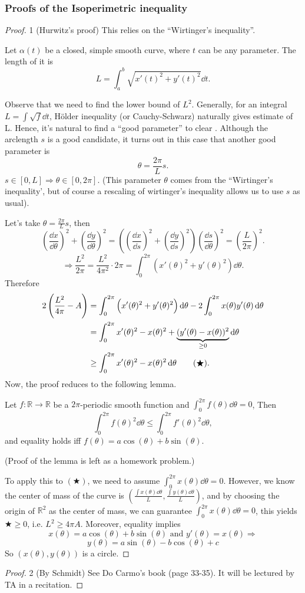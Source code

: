 \subsubsection*{Proofs of the Isoperimetric inequality}
\begin{proof}1 (Hurwitz's proof) This relies on the ``Wirtinger's inequality''.
    
Let $\alpha(t)$ be a closed, simple smooth curve, where $t$ can be any parameter. The length of it is 
\[L=\int_a^b\sqrt{x'(t)^2+y'(t)^2}\dd t.\]

Observe that we need to find the lower bound of $L^2$. 
Generally, for an integral $L=\int \sqrt{f}\dd t$, H\"older 
inequality (or Cauchy-Schwarz) naturally gives estimate of
L. Hence, it's natural to find a ``good parameter'' to 
clear . Although the arclength $s$ is a good candidate, it 
turns out in this case that another good parameter is 
\[\theta=\frac{2\pi}{L}s.\]
$s\in [0,L]\Rightarrow \theta \in [0,2\pi]$.
(This parameter $\theta$ comes from the ``Wirtinger's inequality', but of course a rescaling of wirtinger's inequality allows us to use $s$ as usual).

Let's take $\theta=\frac{2\pi}{L}s$, then
\[\left(\frac{\dd x}{\dd \theta}\right)^2+\left(\frac{\dd y}{\dd \theta}\right)^2=\left(\left(\frac{\dd x}{\dd s}\right)^2+\left(\frac{\dd y}{\dd s}\right)^2\right)\left(\frac{\dd s}{\dd \theta}\right)^2=\left(\frac{L}{2\pi}\right)^2.\]
\[\Rightarrow \frac{L^2}{2\pi}=\frac{L^2}{4\pi^2}\cdot 2\pi=\int_0^{2\pi}\left(x'(\theta)^2+y'(\theta)^2\right)\dd \theta.\]
Therefore
\begin{align}
    2\left(\frac{L^2}{4\pi}-A\right)&=\int_0^{2\pi}\left(x'(\theta)^2+y'(\theta)^2\right)\operatorname{d\!} \theta-2\int_0^{2\pi}x(\theta)y'(\theta)\operatorname{d\!} \theta \notag\\
    &=\int_0^{2\pi}x'(\theta)^2-x(\theta)^2+\underbrace{(y'(\theta)-x(\theta))^2}_{\ge 0}\operatorname{d\!} \theta \notag\\
    &\ge \int_0^{2\pi}x'(\theta)^2-x(\theta)^2 \operatorname{d\!} \theta \tag{$\bigstar$}
.\end{align}
Now, the proof reduces to the following lemma.

\begin{lemma}
    Let $f\colon\mathbb{R}\to \mathbb{R}$ be a $2\pi$-periodic smooth
     function and $\int_0^{2\pi}f(\theta)\dd \theta=0$, Then
    \[\int_0^{2\pi}f(\theta)^2\dd \theta\le \int_0^{2\pi}f'(\theta)^2\dd \theta,\]
    and equality holds iff $f(\theta)=a\cos(\theta)+b\sin(\theta)$.
\end{lemma}
(Proof of the lemma is left as a homework problem.)

To apply this to $(\bigstar)$, we need to assume $\int_0^{2\pi}x(\theta)\dd \theta=0$. However, we know the center of mass of the curve is $\left(\frac{\int x(\theta)\dd \theta}{L},\frac{\int y(\theta)\dd \theta}{L}\right)$, and by choosing the origin of $\mathbb{R}^2$ as the center of mass, we can guarantee $\int_0^{2\pi}x(\theta)\dd \theta=0$, this yields $\bigstar\ge 0$, i.e. $L^2\ge 4\pi A$. Moreover, equality implies
\[x(\theta)=a\cos(\theta)+b\sin(\theta)\text{ and }y'(\theta)=x(\theta)\Rightarrow\]
\[y(\theta)=a\sin(\theta)-b\cos(\theta)+c\]
So $(x(\theta),y(\theta))$ is a circle.
\end{proof}
\begin{proof}2 (By Schmidt)
    See Do Carmo's book (page 33-35). It will be lectured by TA in a recitation.
\end{proof}
